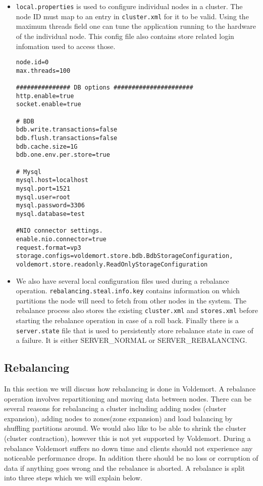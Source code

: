 \begin{itemize}
\item \texttt{local.properties} is used to configure individual nodes in a cluster. The node ID must map to an entry in \texttt{cluster.xml} for it to be valid. Using the maximum threads field one can tune the application running to the hardware of the individual node. This config file also contains store related login infomation used to access those. 

\begin{verbatim}
node.id=0
max.threads=100

############### DB options ######################
http.enable=true
socket.enable=true

# BDB
bdb.write.transactions=false
bdb.flush.transactions=false
bdb.cache.size=1G
bdb.one.env.per.store=true

# Mysql
mysql.host=localhost
mysql.port=1521
mysql.user=root
mysql.password=3306
mysql.database=test

#NIO connector settings.
enable.nio.connector=true
request.format=vp3
storage.configs=voldemort.store.bdb.BdbStorageConfiguration, voldemort.store.readonly.ReadOnlyStorageConfiguration
\end{verbatim}

\item We also have several local configuration files used during a rebalance operation. \texttt{rebalancing.steal.info.key} contains information on which partitions the node will need to fetch from other nodes in the system. The rebalance process also stores the existing \texttt{cluster.xml} and \texttt{stores.xml} before starting the rebalance operation in case of a roll back. Finally there is a \texttt{server.state} file that is used to persistently store rebalance state in case of a failure. It is either SERVER\_NORMAL or SERVER\_REBALANCING. 

\end{itemize}

\subsection{Rebalancing}
In this section we will discuss how rebalancing is done in Voldemort. A rebalance operation involves repartitioning and moving data between nodes. There can be several reasons for rebalancing a cluster including adding nodes (cluster expansion), adding nodes to zones(zone expansion) and load balancing by shuffling partitions around. We would also like to be able to shrink the cluster (cluster contraction), however this is not yet supported by Voldemort. During a rebalance Voldemort suffers no down time and clients should not experience any noticeable performance drops. In addition there should be no loss or corruption of data if anything goes wrong and the rebalance is aborted. A rebalance is split into three steps which we will explain below. 

